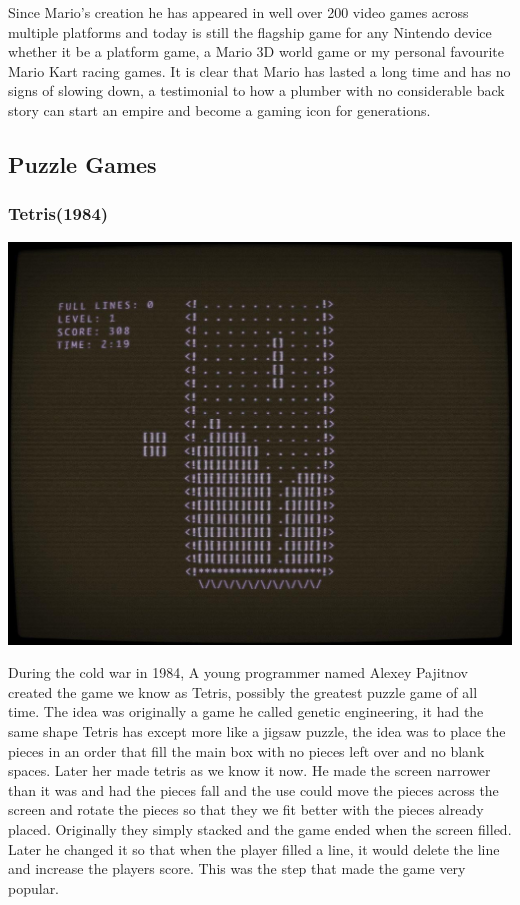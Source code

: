 \documentclass{article}
\begin{document}
Since Mario's creation he has appeared in well over 200 video games across multiple platforms and today is still the flagship game for any Nintendo device whether it be a platform game, a Mario 3D world game or my personal favourite Mario Kart racing games. It is clear that Mario has lasted a long time and has no signs of slowing down, a testimonial to how a plumber with no considerable back story can start an empire and become a gaming icon for generations.
\clearpage
			
\subsection{Puzzle Games}
\subsubsection{Tetris(1984)}
\begin{minipage}{0.43\textwidth}
\includegraphics[width=\linewidth]{tetris}
\end{minipage} \hfill
\begin{minipage}{0.55\textwidth}\raggedright
During the cold war in 1984, A young programmer named Alexey Pajitnov created the game we know as Tetris, possibly the greatest puzzle game of all time. The idea was originally a game he called genetic engineering, it had the same shape Tetris has except more like a jigsaw puzzle, the idea was to place the pieces in an order that fill the main box with no pieces left over and no blank spaces. Later her made tetris as we know it now. He made the screen narrower than it was and had the pieces fall and the use could move the pieces across the screen and rotate the pieces so that they we fit better with the pieces already placed. Originally they simply stacked and the game ended when the screen filled. Later he changed it so that when the player filled a line, it would delete the line and increase the players score. This was the step that made the game very popular. \newline
\end{minipage}
\end{document}
